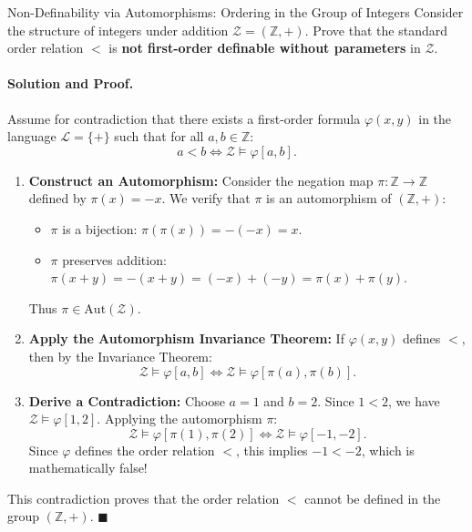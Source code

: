 \begin{workedexample}{Non-Definability via Automorphisms: Ordering in the Group of Integers}
Consider the structure of integers under addition $\mathcal{Z} = (\mathbb{Z}, +)$.
Prove that the standard order relation $<$ is \textbf{not first-order definable without parameters} in $\mathcal{Z}$.

\paragraph{Solution and Proof.}
Assume for contradiction that there exists a first-order formula $\varphi(x, y)$ in the language $\mathcal{L} = \{+\}$ such that for all $a, b \in \mathbb{Z}$:
\[
a < b \iff \mathcal{Z} \models \varphi[a, b].
\]
\begin{enumerate}[leftmargin=1.4em,itemsep=3pt]
  \item \textbf{Construct an Automorphism:}
  Consider the negation map $\pi: \mathbb{Z} \to \mathbb{Z}$ defined by $\pi(x) = -x$.
  We verify that $\pi$ is an automorphism of $(\mathbb{Z}, +)$:
  \begin{itemize}[leftmargin=1.2em,itemsep=1pt]
    \item $\pi$ is a bijection: $\pi(\pi(x)) = -(-x) = x$.
    \item $\pi$ preserves addition: $\pi(x + y) = -(x + y) = (-x) + (-y) = \pi(x) + \pi(y)$.
  \end{itemize}
  Thus $\pi \in \mathrm{Aut}(\mathcal{Z})$.

  \item \textbf{Apply the Automorphism Invariance Theorem:}
  If $\varphi(x, y)$ defines $<$, then by the Invariance Theorem:
  \[
  \mathcal{Z} \models \varphi[a, b] \iff \mathcal{Z} \models \varphi[\pi(a), \pi(b)].
  \]
  \item \textbf{Derive a Contradiction:}
  Choose $a = 1$ and $b = 2$.
  Since $1 < 2$, we have $\mathcal{Z} \models \varphi[1, 2]$.
  Applying the automorphism $\pi$:
  \[
  \mathcal{Z} \models \varphi[\pi(1), \pi(2)] \iff \mathcal{Z} \models \varphi[-1, -2].
  \]
  Since $\varphi$ defines the order relation $<$, this implies $-1 < -2$, which is mathematically false!
\end{enumerate}
This contradiction proves that the order relation $<$ cannot be defined in the group $(\mathbb{Z}, +)$. $\blacksquare$
\end{workedexample}


